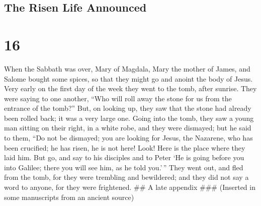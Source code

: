 \hypertarget{the-risen-life-announced}{%
\subsection{The Risen Life Announced}\label{the-risen-life-announced}}

\hypertarget{section-15}{%
\section{16}\label{section-15}}

 When the Sabbath was over, Mary of Magdala, Mary the mother
of James, and Salome bought some spices, so that they might go and
anoint the body of Jesus.  Very early on the first day of
the week they went to the tomb, after sunrise.  They were
saying to one another, ``Who will roll away the stone for us from the
entrance of the tomb?''  But, on looking up, they saw that
the stone had already been rolled back; it was a very large one.
 Going into the tomb, they saw a young man sitting on their
right, in a white robe, and they were dismayed; but he said to them,
 ``Do not be dismayed; you are looking for Jesus, the
Nazarene, who has been crucified; he has risen, he is not here! Look!
Here is the place where they laid him.  But go, and say to
his disciples and to Peter `He is going before you into Galilee; there
you will see him, as he told you.'\,''  They went out, and
fled from the tomb, for they were trembling and bewildered; and they did
not say a word to anyone, for they were frightened. \#\# A late appendix
\#\#\# (Inserted in some manuscripts from an ancient source)

